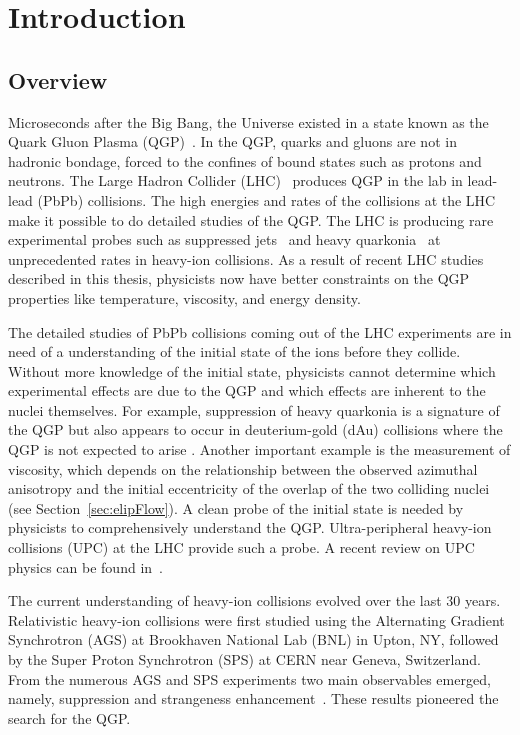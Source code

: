 \chapter{Introduction}
  \section{Overview}
  Microseconds after the Big Bang, the Universe existed in a state known as
    the Quark Gluon Plasma (QGP)~\cite{Witten:1984rs,Vogt:1998kna}.
  In the QGP, quarks and gluons are not in hadronic bondage, forced to 
    the confines of bound states such as protons and neutrons.
  The Large Hadron Collider (LHC)~\cite{Evans:2008zzb} produces QGP in the lab in lead-lead (PbPb)
    collisions.
  The high energies and rates of the collisions at the LHC make it possible 
    to do detailed studies of the QGP. 
  The LHC is producing rare experimental probes such as suppressed jets~\cite{Gyulassy:1990ye} and 
    heavy quarkonia~\cite{Matsui:1986dk} at unprecedented rates in heavy-ion collisions. 
  As a result of recent LHC studies described in this thesis, physicists now 
    have better constraints on the QGP properties like temperature, viscosity, 
    and energy density.

  The detailed studies of PbPb collisions coming out of the LHC 
    experiments are in need of a understanding of the initial state of the ions 
    before they collide.
  Without more knowledge of the initial state, physicists cannot determine 
    which experimental effects are due to the QGP and which effects are 
    inherent to the nuclei themselves. 
  For example, suppression of heavy quarkonia is a signature of the QGP 
    but also appears to occur in deuterium-gold (dAu) collisions where the QGP 
    is not expected to arise \cite{dAuOniaPHENIX}. 
  Another important example is the measurement of viscosity, which depends on 
    the relationship between the observed azimuthal anisotropy and the 
    initial eccentricity of the overlap of the two colliding nuclei 
    (see Section~\ref{sec:elipFlow}). 
  A clean probe of the initial state is needed by physicists to comprehensively 
    understand the QGP.
  Ultra-peripheral heavy-ion collisions (UPC) at the LHC provide such a probe. 
A recent review on UPC physics can be found in~\cite{Baltz:2007kq,Bertulani:2005ru}.

  The current understanding of heavy-ion collisions evolved over the
    last 30 years.
  Relativistic heavy-ion collisions were first studied using the 
    Alternating Gradient Synchrotron (AGS) at Brookhaven National Lab (BNL) 
    in Upton, NY, followed by the Super Proton Synchrotron (SPS) at CERN near 
    Geneva, Switzerland. 
  From the numerous AGS and SPS experiments two main observables emerged,
    namely, \JPsi{} suppression and strangeness enhancement~\cite{Margetis:2000sv}. 
  These results pioneered the search for the QGP. 

